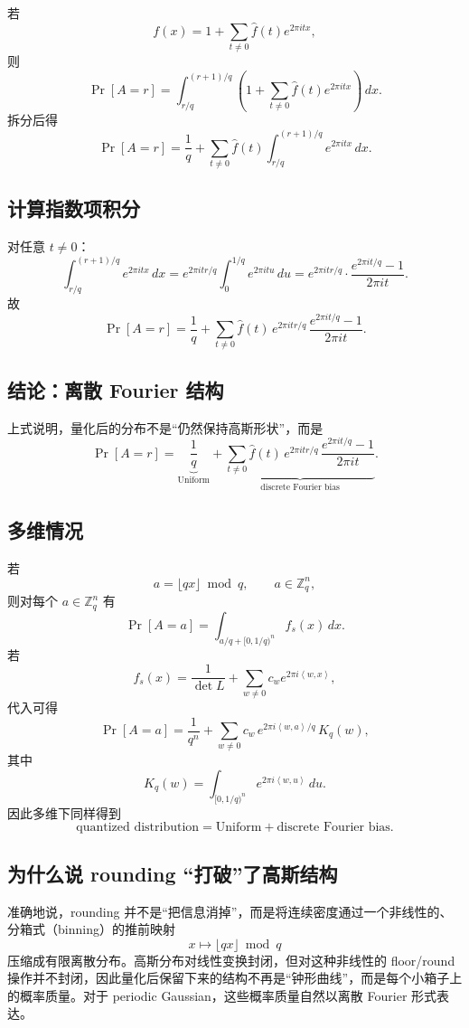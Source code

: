 \documentclass[12pt,a4paper]{ctexart}
\newcommand{\Z}{\mathbb{Z}}
\newcommand{\ip}[2]{\left\langle #1,#2\right\rangle}
\begin{document}
若
\[
f(x)=1+\sum_{t\neq 0}\widehat{f}(t)e^{2\pi i t x},
\]
则
\[
\Pr[A=r]
=
\int_{r/q}^{(r+1)/q}
\left(
1+\sum_{t\neq 0}\widehat{f}(t)e^{2\pi i t x}
\right)\,dx.
\]
拆分后得
\[
\Pr[A=r]
=
\frac{1}{q}
+
\sum_{t\neq 0}\widehat{f}(t)
\int_{r/q}^{(r+1)/q}e^{2\pi i t x}\,dx.
\]

\subsection{计算指数项积分}

对任意 \(t\neq 0\)：
\[
\int_{r/q}^{(r+1)/q}e^{2\pi i t x}\,dx
=
e^{2\pi i tr/q}\int_0^{1/q}e^{2\pi i t u}\,du
=
e^{2\pi i tr/q}\cdot \frac{e^{2\pi i t/q}-1}{2\pi i t}.
\]
故
\[
\Pr[A=r]
=
\frac{1}{q}
+
\sum_{t\neq 0}
\widehat{f}(t)\,
e^{2\pi i tr/q}\,
\frac{e^{2\pi i t/q}-1}{2\pi i t}.
\]

\subsection{结论：离散 Fourier 结构}

上式说明，量化后的分布不是“仍然保持高斯形状”，而是
\[
\Pr[A=r]
=
\underbrace{\frac{1}{q}}_{\text{Uniform}}
+
\underbrace{
\sum_{t\neq 0}
\widehat{f}(t)\,
e^{2\pi i tr/q}\,
\frac{e^{2\pi i t/q}-1}{2\pi i t}
}_{\text{discrete Fourier bias}}.
\]

\subsection{多维情况}

若
\[
a=\lfloor qx\rfloor \bmod q,\qquad a\in \Z_q^n,
\]
则对每个 \(a\in \Z_q^n\) 有
\[
\Pr[A=a]
=
\int_{a/q+[0,1/q)^n} f_s(x)\,dx.
\]
若
\[
f_s(x)=\frac{1}{\det L}+\sum_{w\neq 0} c_w e^{2\pi i\ip{w}{x}},
\]
代入可得
\[
\Pr[A=a]
=
\frac{1}{q^n}
+
\sum_{w\neq 0}
c_w\,
e^{2\pi i\ip{w}{a}/q}\,
K_q(w),
\]
其中
\[
K_q(w)=
\int_{[0,1/q)^n}
e^{2\pi i\ip{w}{u}}\,du.
\]
因此多维下同样得到
\[
\text{quantized distribution}
=
\text{Uniform}
+
\text{discrete Fourier bias}.
\]

\subsection{为什么说 rounding “打破”了高斯结构}

准确地说，rounding 并不是“把信息消掉”，而是将连续密度通过一个非线性的、分箱式（binning）的推前映射
\[
x\mapsto \lfloor qx\rfloor \bmod q
\]
压缩成有限离散分布。高斯分布对线性变换封闭，但对这种非线性的 floor/round 操作并不封闭，因此量化后保留下来的结构不再是“钟形曲线”，而是每个小箱子上的概率质量。对于 periodic Gaussian，这些概率质量自然以离散 Fourier 形式表达。
\end{document}

